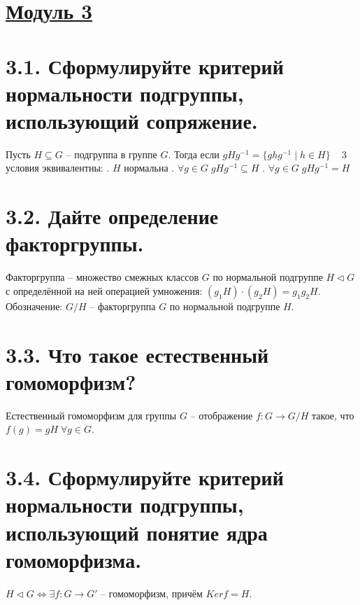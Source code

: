 \documentclass{article}
\begin{document}
\newpage
{}
\section*{\LARGE\centering \underline{Модуль 3}}

\section*{\LARGE 3.1. Сформулируйте критерий нормальности подгруппы, использующий сопряжение.}
Пусть $H \subseteq G$ -- подгруппа в группе $G$. Тогда если $gHg^{-1} = \{ghg^{-1}\;|\;h\in H\}\;\;\;$ 3 условия эквивалентны:
\newline {}. $H$ нормальна
\newline {}. $\forall g \in G \; gHg^{-1} \subseteq H $
\newline {}. $\forall g \in G \; gHg^{-1} = H $

\section*{\LARGE 3.2. Дайте определение факторгруппы.}
Факторгруппа -- множество смежных классов $G$ по нормальной подгруппе $H\triangleleft G$ с определённой на ней операцией умножения: $(g_1H)\cdot(g_2H) = g_1g_2H$. \newline Обозначение: $G/H$ -- факторгруппа $G$ по нормальной подгруппе $H$.

\section*{\LARGE 3.3. Что такое естественный гомоморфизм?}
Естественный гомоморфизм для группы $G$ -- отображение $f : G \rightarrow G/H$ такое, что $f(g) = gH \; \forall g \in G$.

\section*{\LARGE 3.4. Сформулируйте критерий нормальности подгруппы, использующий понятие ядра гомоморфизма.}
$H\triangleleft G \Leftrightarrow \exists f : G \rightarrow G'$ -- гомоморфизм, причём $Kerf = H$.
\end{document}
